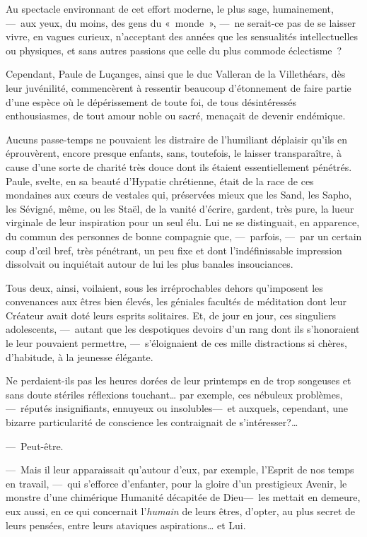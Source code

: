 \documentclass[french,twoside]{book} %
\begin{document}
Au spectacle environnant de cet effort moderne, le plus sage, humainement, — aux yeux, du moins, des gens du « monde », — ne serait-ce pas de se laisser vivre, en vagues curieux, n’acceptant des années que les sensualités intellectuelles ou physiques, et sans autres passions que celle du plus commode éclectisme ?\par
Cependant, Paule de Luçanges, ainsi que le duc Valleran de la Villethéars, dès leur juvénilité, commencèrent à ressentir beaucoup d’étonnement de faire partie d’une espèce où le dépérissement de toute foi, de tous désintéressés enthousiasmes, de tout amour noble ou sacré, menaçait de devenir endémique.\par
Aucuns passe-temps ne pouvaient les distraire de l’humiliant déplaisir qu’ils en éprouvèrent, encore presque enfants, sans, toutefois, le laisser   transparaître, à cause d’une sorte de charité très douce dont ils étaient essentiellement pénétrés. Paule, svelte, en sa beauté d’Hypatie chrétienne, était de la race de ces mondaines aux cœurs de vestales qui, préservées mieux que les Sand, les Sapho, les Sévigné, même, ou les Staël, de la vanité d’écrire, gardent, très pure, la lueur virginale de leur inspiration pour un seul élu. Lui ne se distinguait, en apparence, du commun des personnes de bonne compagnie que, — parfois, — par un certain coup d’œil bref, très pénétrant, un peu fixe et dont l’indéfinissable impression dissolvait ou inquiétait autour de lui les plus banales insouciances.\par
Tous deux, ainsi, voilaient, sous les irréprochables dehors qu’imposent les convenances aux êtres bien élevés, les géniales facultés de méditation dont leur Créateur avait doté leurs esprits solitaires. Et, de jour en jour, ces singuliers adolescents, — autant que les despotiques devoirs d’un rang dont ils s’honoraient le leur pouvaient permettre, — s’éloignaient de ces mille distractions si chères, d’habitude, à la jeunesse élégante.\par
   Ne perdaient-ils pas les heures dorées de leur printemps en de trop songeuses et sans doute stériles réflexions touchant… par exemple, ces nébuleux problèmes, — réputés insignifiants, ennuyeux ou insolubles— et auxquels, cependant, une bizarre particularité de conscience les contraignait de s’intéresser?…\par
— Peut-être.\par
— Mais il leur apparaissait qu’autour d’eux, par exemple, l’Esprit de nos temps en travail, — qui s’efforce d’enfanter, pour la gloire d’un prestigieux Avenir, le monstre d’une chimérique Humanité décapitée de Dieu— les mettait en demeure, eux aussi, en ce qui concernait l’\emph{humain} de leurs êtres, d’opter, au plus secret de leurs pensées, entre leurs ataviques aspirations… et Lui.\par
\end{document}
